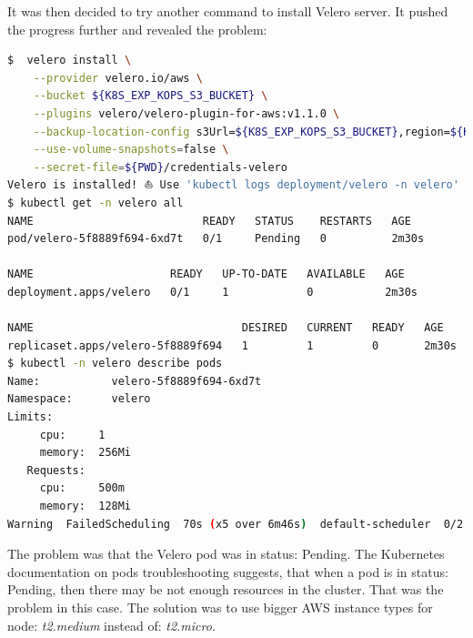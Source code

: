It was then decided to try another command to install Velero server. It pushed the progress further and revealed the problem:
\begin{lstlisting}[basicstyle=\tiny,caption={TODO},captionpos=b,language=Bash,xleftmargin=1cm]
$  velero install \
    --provider velero.io/aws \
    --bucket ${K8S_EXP_KOPS_S3_BUCKET} \
    --plugins velero/velero-plugin-for-aws:v1.1.0 \
    --backup-location-config s3Url=${K8S_EXP_KOPS_S3_BUCKET},region=${K8S_EXP_REGION} \
    --use-volume-snapshots=false \
    --secret-file=${PWD}/credentials-velero
Velero is installed! ⛵ Use 'kubectl logs deployment/velero -n velero' to view the status.
$ kubectl get -n velero all
NAME                          READY   STATUS    RESTARTS   AGE
pod/velero-5f8889f694-6xd7t   0/1     Pending   0          2m30s

NAME                     READY   UP-TO-DATE   AVAILABLE   AGE
deployment.apps/velero   0/1     1            0           2m30s

NAME                                DESIRED   CURRENT   READY   AGE
replicaset.apps/velero-5f8889f694   1         1         0       2m30s
$ kubectl -n velero describe pods
Name:           velero-5f8889f694-6xd7t
Namespace:      velero
Limits:
     cpu:     1
     memory:  256Mi
   Requests:
     cpu:     500m
     memory:  128Mi
Warning  FailedScheduling  70s (x5 over 6m46s)  default-scheduler  0/2 nodes are available: 2 Insufficient cpu.
\end{lstlisting}

The problem was that the Velero pod was in status: Pending. The Kubernetes documentation on pods troubleshooting suggests, that when a pod is in status: Pending, then there may be not enough resources in the cluster\cite{k8s-deb}. That was the problem in this case. The solution was to use bigger AWS instance types for node: \textit{t2.medium} instead of: \textit{t2.micro}.


